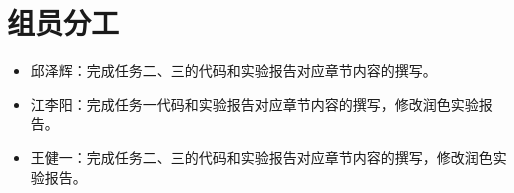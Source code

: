 \section{组员分工}
\begin{itemize}
    \item 邱泽辉：完成任务二、三的代码和实验报告对应章节内容的撰写。
    \item 江李阳：完成任务一代码和实验报告对应章节内容的撰写，修改润色实验报告。
    \item 王健一：完成任务二、三的代码和实验报告对应章节内容的撰写，修改润色实验报告。
\end{itemize}